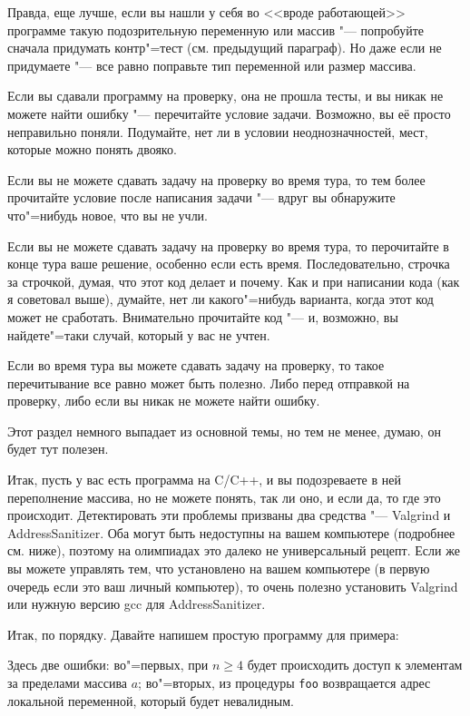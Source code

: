 Правда, еще лучше, если вы нашли у себя во <<вроде работающей>> программе такую подозрительную переменную или массив "---
попробуйте сначала придумать контр"=тест (см. предыдущий параграф). Но даже если не придумаете "--- все равно поправьте тип переменной или размер массива.

Если вы сдавали программу на проверку, она не прошла тесты, и вы никак не можете найти ошибку "--- перечитайте условие задачи. 
Возможно, вы её просто неправильно поняли.
Подумайте, нет ли в условии неоднозначностей, мест, которые можно понять двояко.

Если вы не можете сдавать задачу на проверку во время тура, то тем более прочитайте условие после написания задачи "--- вдруг вы обнаружите что"=нибудь
новое, что вы не учли.

Если вы не можете сдавать задачу на проверку во время тура, то перочитайте в конце тура ваше решение, особенно если есть время. 
Последовательно, строчка за строчкой, думая, что этот код делает и почему. 
Как и при написании кода (как я советовал выше), думайте, нет ли какого"=нибудь варианта, когда этот код может не сработать.
Внимательно прочитайте код "--- и, возможно, вы найдете"=таки случай, который у вас не учтен.

Если во время тура вы можете сдавать задачу на проверку, то такое перечитывание все равно может быть полезно.
Либо перед отправкой на проверку, либо если вы никак не можете найти ошибку.

Этот раздел немного выпадает из основной темы, но тем не менее, думаю, он будет тут полезен.

Итак, пусть у вас есть программа на C/C++, и вы подозреваете в ней переполнение массива, но не можете понять, так ли оно, и если да, то где это происходит.
Детектировать эти проблемы призваны два средства "--- Valgrind и AddressSanitizer. 
Оба могут быть недоступны на вашем компьютере (подробнее см. ниже), поэтому на олимпиадах это далеко не универсальный рецепт.
Если же вы можете управлять тем, что установлено на вашем компьютере (в первую очередь если это ваш личный компьютер),
то очень полезно установить Valgrind или нужную версию gcc для AddressSanitizer.

Итак, по порядку. Давайте напишем простую программу для примера:


Здесь две ошибки: во"=первых, при $n\geq 4$ будет происходить доступ к элементам за пределами массива $a$; во"=вторых, 
из процедуры \verb`foo` возвращается адрес локальной переменной, который будет невалидным.

